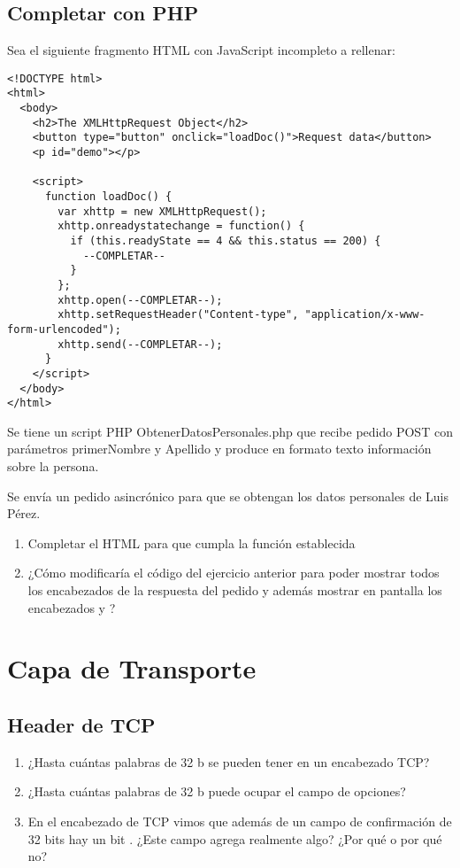 \documentclass[12pt]{report}
\begin{document}
\begin{exer}
	\section{Completar con PHP \stwo}
	Sea el siguiente fragmento HTML con JavaScript incompleto a rellenar:

	\begin{verbatim}
<!DOCTYPE html>
<html>
  <body>
    <h2>The XMLHttpRequest Object</h2>
    <button type="button" onclick="loadDoc()">Request data</button>
    <p id="demo"></p>

    <script>
      function loadDoc() {
        var xhttp = new XMLHttpRequest();
        xhttp.onreadystatechange = function() {
          if (this.readyState == 4 && this.status == 200) {
            --COMPLETAR--
          }
        };
        xhttp.open(--COMPLETAR--);
        xhttp.setRequestHeader("Content-type", "application/x-www-form-urlencoded");
        xhttp.send(--COMPLETAR--);
      }
    </script>
  </body>
</html>
\end{verbatim}

	Se tiene un script PHP ObtenerDatosPersonales.php que recibe pedido POST con parámetros
	primerNombre y Apellido y produce en formato texto información sobre la persona.

	Se envía un pedido asincrónico para que se obtengan los datos personales de Luis Pérez.

	\begin{enumerate}
		\item Completar el HTML para que cumpla la función establecida
		\item ¿Cómo modificaría el código del ejercicio anterior para poder mostrar todos los
		      encabezados de la respuesta del pedido y además mostrar en pantalla los encabezados
		       y ?
	\end{enumerate}
\end{exer}

%
%

\chapter{Capa de Transporte}

\begin{exer}
	\section{Header de TCP \sthree \steo}
	\begin{enumerate}
		\item ¿Hasta cuántas palabras de 32 b se pueden tener en un encabezado TCP?
		\item ¿Hasta cuántas palabras de 32 b puede ocupar el campo de opciones?
		\item En el encabezado de TCP vimos que además de un campo de confirmación de 32 bits hay
		      un bit . ¿Este campo agrega realmente algo? ¿Por qué o por qué no?
	\end{enumerate}
\end{exer}
\end{document}
